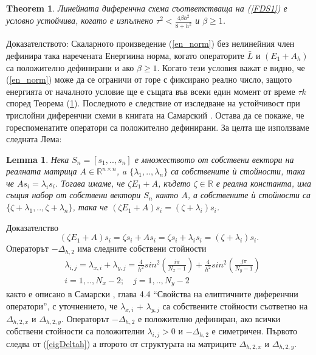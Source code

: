 \documentclass{article}
\newcommand{\be}{\begin{equation}}
\newcommand{\ee}{\end{equation}}
\newcommand{\rf}[1]{(\ref{#1})}
\newcommand{\RR}{\mathbb{R}}
\newtheorem{thm}{Theorem}
\newtheorem{lm}{Lemma}
\begin{document}
\begin{thm}\label{th1}
Линейната диференчна схема съответстваща на \rf{FDS1} е условно устойчива, когато е изпълнено
$\tau^2 < \frac{4 \beta h^2}{8 + h^2}$ и $\beta \ge 1$.
\end{thm}
Доказателството:
Скаларното произведение \rf{en_norm} без нелинейния член дефинира така наречената Енергиина норма, когато операторите $\bar{L}$ и $(E_1 + A_h)$ са положително дефинирани и ако $\beta \ge 1$. Когато тези условия важат е видно, че \rf{en_norm} може да се ограничи от горе с фиксирано реално число, защото енергията от началното условие ще е същата във всеки един момент от време $\tau k$ според Теорема \rf{th1}. Последното е следствие от изследване на устойчивост при трислойни диференчни схеми в книгата на Самарский \cite{samarski}. Остава да се покаже, че гореспоменатите оператори са положително дефинирани. За целта ще използваме следната Лема:

\begin{lm}\label{lemma1}
Нека $S_n=[s_1,..,s_n]$ е множеството от собствени вектори на реалната матрица $A \in \RR^{n\times n}$,
a $\{\lambda_1,..,\lambda_n\}$ са собствените ѝ стойности, така че $A s_i = \lambda_i s_i$. Тогава имаме, че $\zeta E_1 + A$, където $\zeta \in \RR$ е реална константа, има същия набор от собствени вектори $S_n$ както $A$, а собствените ѝ стойности са $\{\zeta + \lambda_1,..,\zeta + \lambda_n\}$, така че $(\zeta E_1 + A)  s_i = (\zeta+ \lambda_i) s_i$.
\end{lm}
Доказателство
\be
(\zeta E_1 + A)  s_i = \zeta s_i + A  s_i = \zeta s_i + \lambda_i s_i = (\zeta + \lambda_i) s_i.
\ee
Операторът $-\Delta_{h,2}$ има следните собствени стойности
\begin{align}\label{eigDeltah}
&\lambda_{i,j} = \lambda_{x, i} + \lambda_{y,j} = \frac{4}{h^2}sin^2(\frac{i \pi}{N_x-1}) +  \frac{4}{h^2}sin^2(\frac{j \pi}{N_y-1}) \\
&i = 1,..,N_x-2; \quad j = 1, .. , N_y-2 \nonumber
\end{align}
както е описано в Самарски \cite{samarski}, глава 4.4 ``Свойства на елиптичните диференчни оператори'', с уточнението, че $\lambda_{x, i}$ + $\lambda_{y,j}$ са собствените стойности съответно на $\Delta_{h,2,x}$ и $\Delta_{h,2,y}$. Операторът $-\Delta_{h,2}$ е положително дефиниран, ако всички собствени стойности са положителни $\lambda_{i,j}>0$ и $-\Delta_{h,2}$ е симетричен. Първото следва от \rf{eigDeltah} а второто от структурата на матриците $\Delta_{h,2,x}$ и $\Delta_{h,2,y}$.
\end{document}
